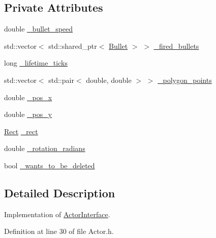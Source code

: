 \subsection*{Private Attributes}
\begin{DoxyCompactItemize}
\item 
double \hyperlink{classAsteroids_1_1Domain_1_1Game_1_1Actors_1_1Actor_a6e1aa905d84aca7fe572b06fd377f8a9}{\+\_\+bullet\+\_\+speed}
\item 
std\+::vector$<$ std\+::shared\+\_\+ptr$<$ \hyperlink{classAsteroids_1_1Domain_1_1Game_1_1Actors_1_1Bullet}{Bullet} $>$ $>$ \hyperlink{classAsteroids_1_1Domain_1_1Game_1_1Actors_1_1Actor_a40ef7864463e5f56099805ab2e8d1894}{\+\_\+fired\+\_\+bullets}
\item 
long \hyperlink{classAsteroids_1_1Domain_1_1Game_1_1Actors_1_1Actor_ad20699aaa5bb455f74d6d4564d62c8ee}{\+\_\+lifetime\+\_\+ticks}
\item 
std\+::vector$<$ std\+::pair$<$ double, double $>$ $>$ \hyperlink{classAsteroids_1_1Domain_1_1Game_1_1Actors_1_1Actor_af5b5114aaf087d384775c0d710ddb2d2}{\+\_\+polygon\+\_\+points}
\item 
double \hyperlink{classAsteroids_1_1Domain_1_1Game_1_1Actors_1_1Actor_a67fe46725b6203a430ea8d4c929a9880}{\+\_\+pos\+\_\+x}
\item 
double \hyperlink{classAsteroids_1_1Domain_1_1Game_1_1Actors_1_1Actor_ae522d2e994969a4379160a6aa7c2dd9f}{\+\_\+pos\+\_\+y}
\item 
\hyperlink{classAsteroids_1_1Domain_1_1Game_1_1Actors_1_1Rect}{Rect} \hyperlink{classAsteroids_1_1Domain_1_1Game_1_1Actors_1_1Actor_a59eb4ba9e400207f0340be54362f177f}{\+\_\+rect}
\item 
double \hyperlink{classAsteroids_1_1Domain_1_1Game_1_1Actors_1_1Actor_ac58af22007e4ae498810618420eb5616}{\+\_\+rotation\+\_\+radians}
\item 
bool \hyperlink{classAsteroids_1_1Domain_1_1Game_1_1Actors_1_1Actor_ad9bc276327b7126b38065d2a0d9c878d}{\+\_\+wants\+\_\+to\+\_\+be\+\_\+deleted}
\end{DoxyCompactItemize}


\subsection{Detailed Description}
Implementation of \hyperlink{classAsteroids_1_1Domain_1_1Game_1_1Actors_1_1ActorInterface}{Actor\+Interface}. 

Definition at line 30 of file Actor.\+h.



